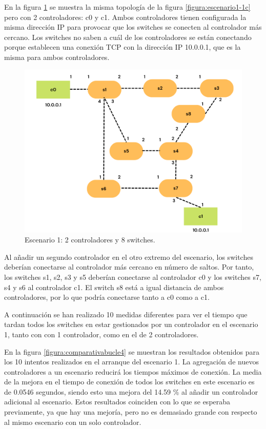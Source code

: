 \documentclass[a4paper, 12pt]{book}
\begin{document}
 	En la figura \ref{figura:escenario1-2c} se muestra la misma topología de la figura \ref{figura:escenario1-1c} pero con 2 controladores: c0 y c1. Ambos controladores tienen configurada la misma dirección IP para provocar que los switches se conecten al controlador más cercano. Los switches no saben a cuál de los controladores se están conectando porque establecen una conexión TCP con la dirección IP 10.0.0.1, que es la misma para ambos controladores.
 	
 	\begin{figure}[H]
 		\centering
 		\includegraphics[width=12cm, keepaspectratio]{img/escenario1-2}
 		\caption{Escenario 1: 2 controladores y 8 switches.}
 		\label{figura:escenario1-2c}
 		\vspace{-18pt}
 	\end{figure}
 	
 	 Al añadir un segundo controlador en el otro extremo del escenario, los switches deberían conectarse al controlador más cercano en número de saltos. Por tanto, los switches	 s1, s2, s3 y s5 deberían conectarse al controlador c0 y los switches s7, s4 y s6 al controlador c1. El switch
 	 s8 está a igual distancia de ambos controladores, por lo que podría conectarse tanto a c0 como a c1.
 	 
 	 A continuación se han realizado 10 medidas diferentes para ver el tiempo que tardan todos los switches en estar gestionados por un controlador en el escenario 1, tanto con con 1 controlador, como en el de 2 controladores.
 	
 En la figura \ref{figura:comparativabucle4} se muestran los resultados obtenidos para los 10 intentos realizados en el arranque del escenario 1. La agregación de nuevos controladores a un escenario reducirá los tiempos máximos de conexión. La media de la mejora en el tiempo de conexión de todos los switches en este escenario es de 0.0546 segundos, siendo esto una mejora del 14.59 \% al añadir un controlador adicional al escenario. 
 	Estos resultados coinciden con lo que se esperaba previamente, ya que hay una mejoría, pero no es demasiado grande con respecto al mismo escenario con un solo controlador.
 	
\end{document}
